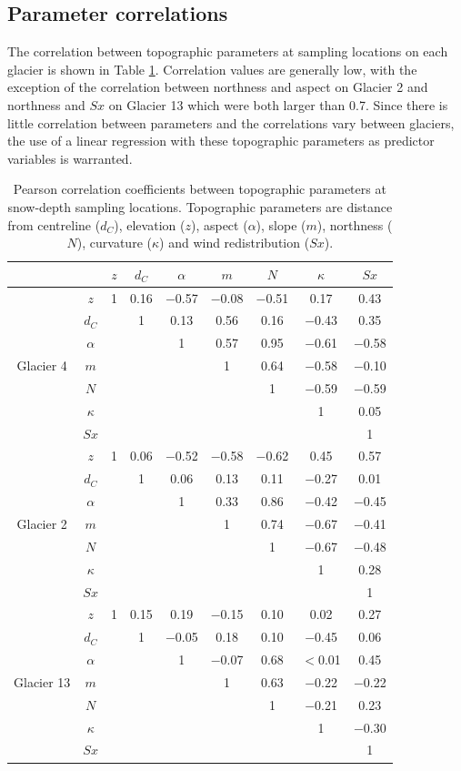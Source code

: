 \documentclass{sfuthesis}
\newcommand{\params}{Topographic parameters are distance from centreline ($d_C$), elevation ($z$), aspect ($\alpha$), slope ($m$), northness ($N$), curvature ($\kappa$) and wind redistribution ($Sx$). }
\begin{document}
\subsection{Parameter correlations}

The correlation between topographic parameters at sampling locations on each glacier is shown in Table \ref{tab:pearson_correlation}. Correlation values are generally low, with the exception of the correlation between northness and aspect on Glacier 2 and northness and $Sx$ on Glacier 13 which were both larger than 0.7. Since there is little correlation between parameters and the correlations vary between glaciers, the use of a linear regression with these topographic parameters as predictor variables is warranted. 

\begin{table}[H]
\centering
\caption{Pearson correlation coefficients between topographic parameters at snow-depth sampling locations. \params}
\label{tab:pearson_correlation}
\begin{tabular}{cc|ccccccc}
 &  & $z$ & $d_C$ & $\alpha$ & $m$ & $N$ & $\kappa$ & $Sx$ \\ \hline
\multirow{7}{*}{Glacier 4} & $z$ & 1 & 0.16 & $-$0.57 & $-$0.08 & $-$0.51 & 0.17 & 0.43 \\
 & $d_C$ &  & 1 & 0.13 & 0.56 & 0.16 & $-$0.43 & 0.35 \\
 & $\alpha$ &   &  & 1 & 0.57 & 0.95 & $-$0.61 & $-$0.58 \\
 & $m$ &   &   &   & 1 & 0.64 & $-$0.58 & $-$0.10 \\
 & $N$ &   &   &   &   & 1 & $-$0.59 & $-$0.59 \\
 & $\kappa$ &   &   &   &   &   & 1 & 0.05 \\
 & $Sx$ &   &   &   &   &   &   & 1 \\ \hline
\multirow{7}{*}{Glacier 2} & $z$ & 1 & 0.06 & $-$0.52 & $-$0.58 & $-$0.62 & 0.45 & 0.57 \\
 & $d_C$ &   & 1 & 0.06 & 0.13 & 0.11 & $-$0.27 & 0.01 \\
 & $\alpha$ &   &  & 1 & 0.33 & 0.86 & $-$0.42 & $-$0.45 \\
 & $m$ &   &   &   & 1 & 0.74 & $-$0.67 & $-$0.41 \\
 & $N$ &   &   &   &   & 1 & $-$0.67 & $-$0.48 \\
 & $\kappa$ & &   &   &   &   & 1 & 0.28 \\
 & $Sx$ &   &   &   &   &   &   & 1 \\ \hline
\multirow{7}{*}{Glacier 13} & $z$ & 1 & 0.15 & 0.19 & $-$0.15 & 0.10 & 0.02 & 0.27 \\
 & $d_C$ &   & 1 & $-$0.05 & 0.18 & 0.10 & $-$0.45 & 0.06 \\
 & $\alpha$ &   &   & 1 & $-$0.07 & 0.68 & $<$0.01 & 0.45 \\
 & $m$ &   &   &   & 1 & 0.63 & $-$0.22 & $-$0.22 \\
 & $N$ &   &   &   &   & 1 & $-$0.21 & 0.23 \\
 & $\kappa$ &   &   &   &   &   & 1 & $-$0.30 \\
 & $Sx$ &   &   &   &   &   &   & 1
\end{tabular}
\end{table}
\end{document}
